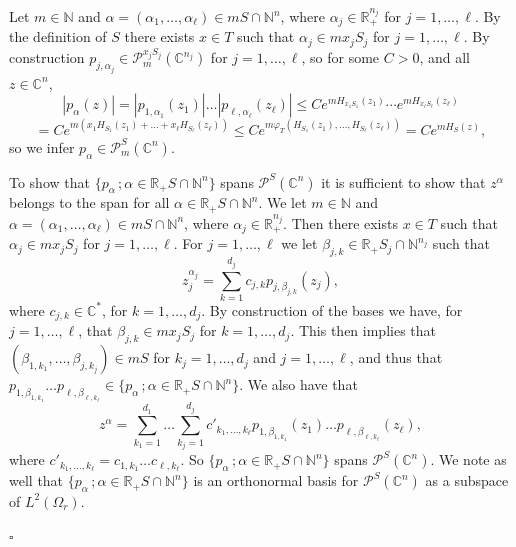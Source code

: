 \documentclass[a4paper,12pt,leqno,english]{article}
\numberwithin{equation}{section}
\newenvironment{proof}{\medbreak\noindent{\bf  Proof:}\rm}{\hfill$\square$\rm}
\begin{document}
\begin{proof}
Let $m \in \mathbb{N}$ and $\alpha = (\alpha_1, \dots, \alpha_\ell) \in mS \cap \mathbb{N}^n$,
    where $\alpha_j \in \mathbb{R}_+^{n_j}$ for $j = 1, \dots, \ell$.
By the definition of $S$ there exists $x \in T$ such that $\alpha_j \in m x_j S_j$ for $j = 1, \dots, \ell$.
By construction $p_{j, \alpha_j} \in \mathcal{P}^{x_j S_j}_m(\mathbb{C}^{n_j})$ for $j = 1, \dots, \ell$,
    so for some $C > 0$, and all $z \in \mathbb{C}^n$, 
\begin{equation*}
    |p_\alpha(z)|
    =
    |p_{1, \alpha_1}(z_1)| \dots |p_{\ell, \alpha_\ell}(z_\ell)|
    \leq
    C e^{mH_{x_1 S_1}(z_1)} \cdots e^{mH_{x_\ell S_\ell }(z_\ell )} 
\end{equation*}
\begin{equation*}
    =
    C e^{m(x_1 H_{S_1}(z_1) + \dots + x_\ell H_{S_\ell}(z_\ell))} 
    \leq
    C e^{m \varphi_T(H_{S_1}(z_1), \dots, H_{S_\ell}(z_\ell))}
    =
    C e^{m H_S(z)},
\end{equation*}
so we infer $p_\alpha \in \mathcal{P}^S_m(\mathbb{C}^n)$.

To show that $\{p_\alpha\,; \alpha \in \mathbb{R}_+S \cap \mathbb{N}^n\}$ spans $\mathcal{P}^S(\mathbb{C}^n)$ it is sufficient to
    show that $z^\alpha$ belongs to the span for all $\alpha \in \mathbb{R}_+S \cap \mathbb{N}^n$.
We let $m \in \mathbb{N}$ and $\alpha = (\alpha_1, \dots, \alpha_\ell) \in mS \cap \mathbb{N}^n$,
    where $\alpha_j \in \mathbb{R}_+^{n_j}$.
Then there exists $x \in T$ such that $\alpha_j \in m x_j S_j$ for $j = 1, \dots, \ell$.
For $j = 1, \dots, \ell$ we let $\beta_{j, k} \in \mathbb{R}_+S_j \cap \mathbb{N}^{n_j}$ such that
\begin{equation*}
    z_j^{\alpha_j}
    =
    \sum_{k = 1}^{d_j} c_{j, k} p_{j, \beta_{j, k}}(z_j),
\end{equation*}
where $c_{j, k} \in \mathbb{C}^*$, for $k = 1, \dots, d_j$.
By construction of the bases we have, for $j = 1, \dots, \ell$, that $\beta_{j, k} \in m x_j S_j$ for $k = 1, \dots, d_j$.
This then implies that $(\beta_{1, k_1}, \dots, \beta_{j, k_j}) \in mS$ for $k_j = 1, \dots, d_j$ and $j = 1, \dots, \ell$,
    and thus that $p_{1, \beta_{1, k_1}} \dots p_{\ell, \beta_{\ell, k_\ell}} \in \{p_\alpha\,; \alpha \in \mathbb{R}_+S \cap \mathbb{N}^n\}$.
We also have that
\begin{equation*}
    z^\alpha
    =
    \sum_{k_1 = 1}^{d_1} \dots \sum_{k_j = 1}^{d_j}
        c'_{k_1, \dots, k_\ell} p_{1, \beta_{1, k_1}}(z_1) \dots p_{\ell, \beta_{\ell, k_\ell}}(z_\ell),
\end{equation*}
where $c'_{k_1, \dots, k_\ell} = c_{1, k_1} \dots c_{\ell, k_\ell}$.
So $\{p_\alpha\,; \alpha \in \mathbb{R}_+S \cap \mathbb{N}^n\}$ spans $\mathcal{P}^S(\mathbb{C}^n)$.
We note as well that $\{p_\alpha\,; \alpha \in \mathbb{R}_+S \cap \mathbb{N}^n\}$ is an orthonormal basis for $\mathcal{P}^S(\mathbb{C}^n)$
    as a subspace of $L^2(\Omega_r)$.


\end{proof}
\end{document}
